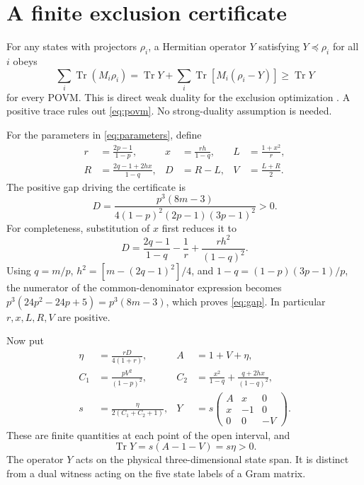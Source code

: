 \documentclass[11pt]{article}
\newcommand{\Tr}{\operatorname{Tr}}
\begin{document}
\section{A finite exclusion certificate}
For any states with projectors $\rho_i$, a Hermitian operator $Y$
satisfying $Y\preceq\rho_i$ for all $i$ obeys
\begin{equation}
 \sum_i\Tr(M_i\rho_i)
  =\Tr Y+\sum_i\Tr\!\left[M_i(\rho_i-Y)\right]\geq\Tr Y
 \label{eq:weak-duality}
\end{equation}
for every POVM. This is direct weak duality for the exclusion
optimization \cite[Eq.~(2)]{JRS25}. A positive trace rules out
\eqref{eq:povm}. No strong-duality assumption is needed.

For the parameters in \eqref{eq:parameters}, define
\begin{align}
 r&=\frac{2p-1}{1-p},&
 x&=\frac{rh}{1-q},&
 L&=\frac{1+x^2}{r},\nonumber\\
 R&=\frac{2q-1+2hx}{1-q},&
 D&=R-L,&
 V&=\frac{L+R}{2}.
 \label{eq:auxiliary}
\end{align}
The positive gap driving the certificate is
\begin{equation}
 D=\frac{p^3(8m-3)}
          {4(1-p)^2(2p-1)(3p-1)^2}>0.
 \label{eq:gap}
\end{equation}
For completeness, substitution of $x$ first reduces it to
\[
 D=\frac{2q-1}{1-q}-\frac1r+\frac{rh^2}{(1-q)^2}.
\]
Using $q=m/p$, $h^2=[m-(2q-1)^2]/4$, and
$1-q=(1-p)(3p-1)/p$, the numerator of the common-denominator
expression becomes $p^3(24p^2-24p+5)=p^3(8m-3)$,
which proves \eqref{eq:gap}. In particular $r,x,L,R,V$ are positive.

Now put
\begin{align}
 \eta&=\frac{rD}{4(1+r)},&
 A&=1+V+\eta,\nonumber\\
 C_1&=\frac{pV^2}{(1-p)^2},&
 C_2&=\frac{x^2}{1-q}+\frac{q+2hx}{(1-q)^2},\nonumber\\
 s&=\frac{\eta}{2(C_1+C_2+1)},&
 Y&=s\begin{pmatrix}A&x&0\\x&-1&0\\0&0&-V\end{pmatrix}.
 \label{eq:dual}
\end{align}
These are finite quantities at each point of the open interval, and
\begin{equation}
 \Tr Y=s(A-1-V)=s\eta>0.
 \label{eq:trace}
\end{equation}
The operator $Y$ acts on the physical three-dimensional state span.
It is distinct from a dual witness acting on the five state labels
of a Gram matrix.
\end{document}
